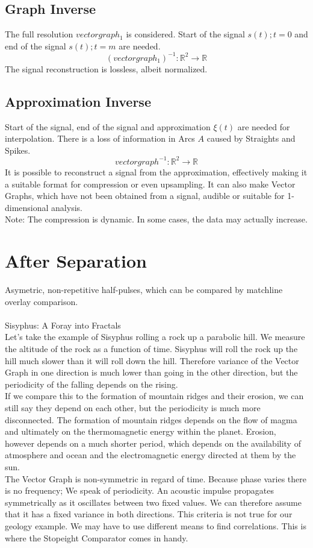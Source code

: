 \documentclass{report}
\begin{document}
\section{Graph Inverse}
The full resolution $vectorgraph_{1}$ is considered. Start of the signal $s(t);t=0$ and end of the signal $s(t);t=m$ are needed.
\begin{equation}
(vectorgraph_{1})^{-1}: \mathbb{R}^2 \rightarrow \mathbb{R}
\end{equation}
The signal reconstruction is lossless, albeit normalized.
\section{Approximation Inverse}
Start of the signal, end of the signal and approximation $\xi(t)$ are needed for interpolation. There is a loss of information in Arcs $A$ caused by Straights and Spikes.
\begin{equation}
vectorgraph^{-1}: \mathbb{R}^2 \rightarrow \mathbb{R}
\end{equation}
It is possible to reconstruct a signal from the approximation, effectively making it a suitable format for compression or even upsampling. It can also make Vector Graphs, which have not been obtained from a signal, audible or suitable for 1-dimensional analysis.\\
Note: The compression is dynamic. In some cases, the data may actually increase.

\chapter{After Separation}
Asymetric, non-repetitive half-pulses, which can be compared by matchline overlay comparison.\\\\
Sisyphus: A Foray into Fractals\\
Let's take the example of Sisyphus rolling a rock up a parabolic hill. We measure the altitude of the rock as a function of time. Sisyphus will roll the rock up the hill much slower than it will roll down the hill. Therefore variance of the Vector Graph in one direction is much lower than going in the other direction, but the periodicity of the falling depends on the rising.\\
If we compare this to the formation of mountain ridges and their erosion, we can still say they depend on each other, but the periodicity is much more disconnected. The formation of mountain ridges depends on the flow of magma and ultimately on the thermomagnetic energy within the planet. Erosion, however depends on a much shorter period, which depends on the availability of atmosphere and ocean and the electromagnetic energy directed at them by the sun.\\
The Vector Graph is non-symmetric in regard of time. Because phase varies there is no frequency; We speak of periodicity. An acoustic impulse propagates symmetrically as it oscillates between two fixed values. We can therefore assume that it has a fixed variance in both directions. This criteria is not true for our geology example. We may have to use different means to find correlations. This is where the Stopeight Comparator comes in handy.\\

\iffalse
\printbibliography
\fi
{}

\end{document}
